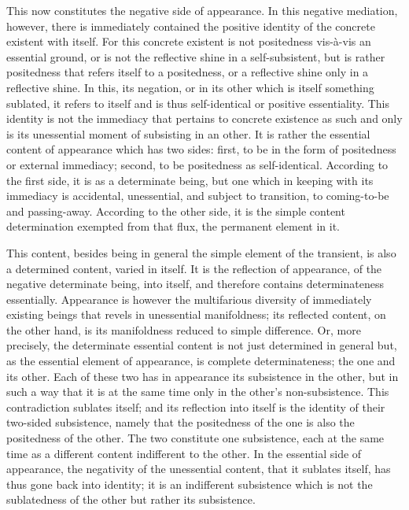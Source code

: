 This now constitutes the negative side of appearance.
In this negative mediation, however,
there is immediately contained the positive identity of
the concrete existent with itself.
For this concrete existent is not positedness
vis-à-vis an essential ground,
or is not the reflective shine in a self-subsistent,
but is rather positedness that refers itself to a positedness,
or a reflective shine only in a reflective shine.
In this, its negation, or in its other
which is itself something sublated,
it refers to itself and is thus
self-identical or positive essentiality.
This identity is not the immediacy
that pertains to concrete existence as such
and only is its unessential moment of subsisting in an other.
It is rather the essential content of appearance which has two sides:
first, to be in the form of positedness or external immediacy;
second, to be positedness as self-identical.
According to the first side, it is as a determinate being,
but one which in keeping with its immediacy is accidental, unessential,
and subject to transition, to coming-to-be and passing-away.
According to the other side, it is the simple content determination
exempted from that flux, the permanent element in it.

This content, besides being in general
the simple element of the transient,
is also a determined content, varied in itself.
It is the reflection of appearance,
of the negative determinate being, into itself,
and therefore contains determinateness essentially.
Appearance is however the multifarious diversity of
immediately existing beings that revels in unessential manifoldness;
its reflected content, on the other hand,
is its manifoldness reduced to simple difference.
Or, more precisely, the determinate essential content is not
just determined in general but,
as the essential element of appearance,
is complete determinateness; the one and its other.
Each of these two has in appearance
its subsistence in the other,
but in such a way that it is at the same time
only in the other's non-subsistence.
This contradiction sublates itself;
and its reflection into itself is
the identity of their two-sided subsistence,
namely that the positedness of the one is
also the positedness of the other.
The two constitute one subsistence,
each at the same time as a different content
indifferent to the other.
In the essential side of appearance,
the negativity of the unessential content,
that it sublates itself, has thus gone back into identity;
it is an indifferent subsistence which is not
the sublatedness of the other but rather its subsistence.

